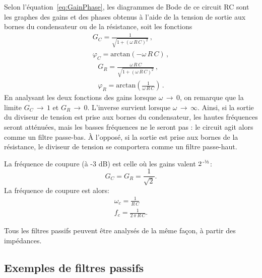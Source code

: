 \documentclass[canadien,12pt,oneside,letterpaper]{article}
\begin{document}
Selon l'équation~\eqref{eq:GainPhase}, les diagrammes de Bode de ce circuit RC sont les graphes des gains et des phases obtenus à l'aide de la tension de sortie aux bornes du condensateur ou de la résistance, soit les fonctions
\begin{subequations}
\begin{gather}
G_C=\frac{1}{\sqrt{1+\left(\omega\,R\,C\right)^2}}\,,\\
\varphi_C=\mathrm{arctan}\!\left(-\omega\,R\,C\right)\,,
\end{gather}
\end{subequations}
\begin{subequations}
\begin{gather}
G_R=\frac{\omega\,R\,C}{\sqrt{1+\left(\omega\,R\,C\right)^2}}\,,\\
\varphi_R=\mathrm{arctan}\!\left(\frac{1}{\omega\,R\,C}\right)\,.
\end{gather}
\end{subequations}
En analysant les deux fonctions des gains lorsque $\omega\,\rightarrow\,0$, on remarque que la limite $G_C\,\rightarrow\,1$ et $G_R\,\rightarrow\,0$. L'inverse survient lorsque $\omega\,\rightarrow\,\infty$. Ainsi, si la sortie du diviseur de tension est prise aux bornes du condensateur, les hautes fréquences seront atténuées, mais les basses fréquences ne le seront pas : le circuit agit alors comme un filtre passe-bas. À l'opposé, si la sortie est prise aux bornes de la résistance, le diviseur de tension se comportera comme un filtre passe-haut.

La fréquence de coupure (à -3 dB) est celle où les gains valent $2^{\,\text{-\textonehalf}}$:
\begin{equation}
G_C=G_R=\frac{1}{\sqrt{2}}.
\end{equation}
La fréquence de coupure est alors:
\begin{subequations}
\begin{gather}
\omega_c=\frac{1}{R\,C}\\
f_c=\frac{1}{2\,\pi\,R\,C}.
\end{gather}
\end{subequations}

Tous les filtres passifs peuvent être analysés de la même façon, à partir des impédances.


\subsection{Exemples de filtres passifs}
\end{document}
